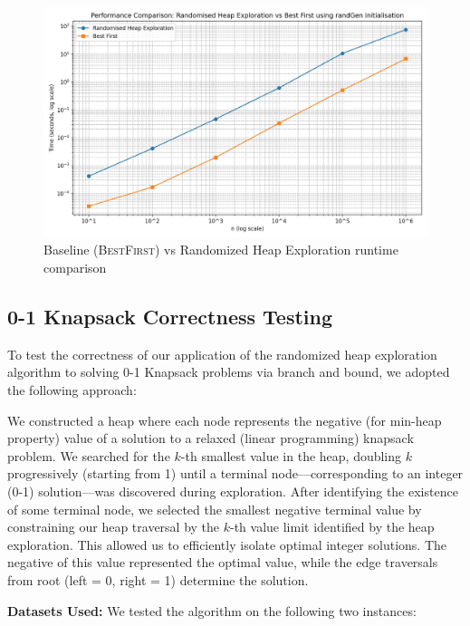 \documentclass[conference]{IEEEtran}
\begin{document}
\begin{figure}
    \centering
    \includegraphics[width=1\linewidth]{images/algo-comparison.jpeg}
    \caption{Baseline (\textsc{BestFirst}) vs Randomized Heap Exploration runtime comparison}
    \label{fig:comparison}
\end{figure}

\subsection{0-1 Knapsack Correctness Testing}

To test the correctness of our application of the randomized heap exploration algorithm to solving 0-1 Knapsack problems via branch and bound, we adopted the following approach:

We constructed a heap where each node represents the negative (for min-heap property) value of a solution to a relaxed (linear programming) knapsack problem. We searched for the $k$-th smallest value in the heap, doubling $k$ progressively (starting from 1) until a terminal node—corresponding to an integer (0-1) solution—was discovered during exploration. After identifying the existence of some terminal node, we selected the smallest negative terminal value by constraining our heap traversal by the $k$-th value limit identified by the heap exploration. This allowed us to efficiently isolate optimal integer solutions. The negative of this value represented the optimal value, while the edge traversals from root (left = 0, right = 1) determine the solution. 

\vspace{0.5em}
\noindent
\textbf{Datasets Used:}
We tested the algorithm on the following two instances:
\end{document}
